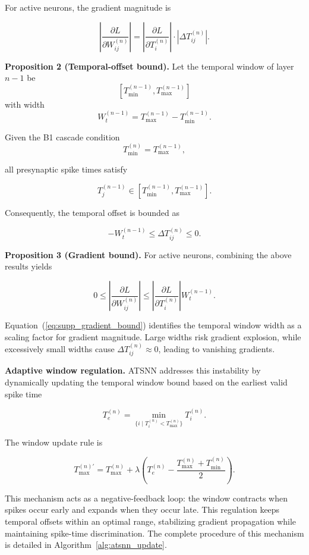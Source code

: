 \documentclass[12pt]{article}
\begin{document}
For active neurons, the gradient magnitude is

\[
\left|
\frac{\partial L}{\partial W_{ij}^{(n)}}
\right|
=
\left|
\frac{\partial L}{\partial T_i^{(n)}}
\right|
\cdot
|\Delta T_{ij}^{(n)}|.
\]

\textbf{Proposition 2 (Temporal-offset bound).}
Let the temporal window of layer $n-1$ be
\[
[T_{\min}^{(n-1)}, T_{\max}^{(n-1)}]
\]
with width
\[
W_t^{(n-1)} =
T_{\max}^{(n-1)} - T_{\min}^{(n-1)}.
\]

Given the B1 cascade condition
\[
T_{\min}^{(n)} = T_{\max}^{(n-1)},
\]

all presynaptic spike times satisfy

\[
T_j^{(n-1)} \in
[T_{\min}^{(n-1)}, T_{\max}^{(n-1)}].
\]

Consequently, the temporal offset is bounded as

\begin{equation}
- W_t^{(n-1)}
\le
\Delta T_{ij}^{(n)}
\le
0.
\label{eq:supp_offset_bound}
\end{equation}

\textbf{Proposition 3 (Gradient bound).}
For active neurons, combining the above results yields

\begin{equation}
0
\le
\left|
\frac{\partial L}{\partial W_{ij}^{(n)}}
\right|
\le
\left|
\frac{\partial L}{\partial T_i^{(n)}}
\right|
W_t^{(n-1)}.
\label{eq:supp_gradient_bound}
\end{equation}

Equation~(\ref{eq:supp_gradient_bound}) identifies the temporal window width as a scaling factor for gradient magnitude. Large widths risk gradient explosion, while excessively small widths cause $\Delta T_{ij}^{(n)} \approx 0$, leading to vanishing gradients.

\textbf{Adaptive window regulation.}
ATSNN addresses this instability by dynamically updating the temporal window bound based on the earliest valid spike time

\[
T_e^{(n)} =
\min_{\{i \mid T_i^{(n)} < T_{\max}^{(n)}\}}
T_i^{(n)}.
\]

The window update rule is

\begin{equation}
T_{\max}^{(n)\prime} =
T_{\max}^{(n)}
+
\lambda
\left(
T_e^{(n)} -
\frac{T_{\max}^{(n)}+T_{\min}^{(n)}}{2}
\right).
\label{eq:supp_window_update}
\end{equation}

This mechanism acts as a negative-feedback loop: the window contracts when spikes occur early and expands when they occur late. This regulation keeps temporal offsets within an optimal range, stabilizing gradient propagation while maintaining spike-time discrimination. The complete procedure of this mechanism is detailed in Algorithm~\ref{alg:atsnn_update}.
\end{document}
